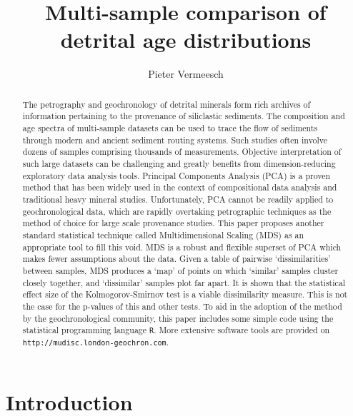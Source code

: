 \documentclass[authoryear,preprint,review,12pt]{elsarticle}
\begin{document}
\begin{frontmatter}
\title{Multi-sample comparison of detrital age distributions}
\author{Pieter Vermeesch}
\address{
University College London\\
Gower Street, London WC1E 6BT\\
+44 (0)20 7679 2418\\
\texttt{p.vermeesch@ucl.ac.uk}
}

\begin{abstract}
The petrography and geochronology of detrital minerals form rich
archives of information pertaining to the provenance of siliclastic
sediments. The composition and age spectra of multi-sample datasets
can be used to trace the flow of sediments through modern and ancient
sediment routing systems. Such studies often involve dozens of samples
comprising thousands of measurements. Objective interpretation of such
large datasets can be challenging and greatly benefits from
dimension-reducing exploratory data analysis tools. Principal
Components Analysis (PCA) is a proven method that has been widely used
in the context of compositional data analysis and traditional heavy
mineral studies. Unfortunately, PCA cannot be readily applied to
geochronological data, which are rapidly overtaking petrographic
techniques as the method of choice for large scale provenance
studies. This paper proposes another standard statistical technique
called Multidimensional Scaling (MDS) as an appropriate tool to fill
this void.  MDS is a robust and flexible superset of PCA which makes
fewer assumptions about the data.  Given a table of pairwise
`dissimilarities' between samples, MDS produces a `map' of points on
which `similar' samples cluster closely together, and `dissimilar'
samples plot far apart.  It is shown that the statistical effect size
of the Kolmogorov-Smirnov test is a viable dissimilarity measure. This
is not the case for the p-values of this and other tests.  To aid in
the adoption of the method by the geochronological community, this
paper includes some simple code using the statistical programming
language \texttt{R}. More extensive software tools are provided on
\verb#http://mudisc.london-geochron.com#.

\end{abstract}
\end{frontmatter}

\section{Introduction}
\label{sec:introduction}
\end{document}

